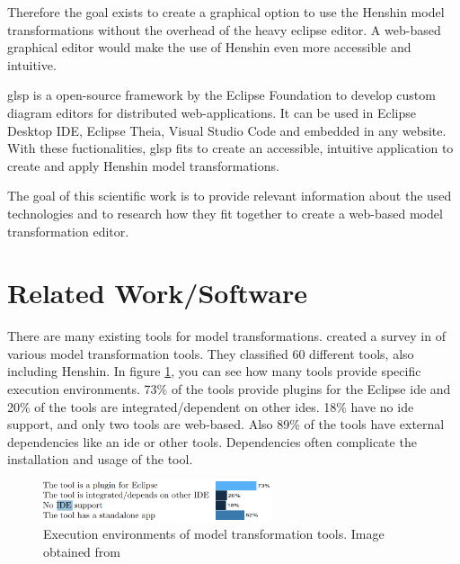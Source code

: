 \documentclass[conference,onecolumn]{IEEEtran}
\begin{document}
  Therefore the goal exists to create a graphical option to use the Henshin model transformations without the overhead of the heavy eclipse editor. A web-based graphical editor would make the use of Henshin even more accessible and intuitive.

  \ac{glsp} is a open-source framework by the Eclipse Foundation to develop custom diagram editors for distributed web-applications. \cite{glsp-repo} It can be used in Eclipse Desktop IDE, Eclipse Theia, Visual Studio Code and embedded in any website. With these fuctionalities, \ac{glsp} fits to create an accessible, intuitive application to create and apply Henshin model transformations.

  The goal of this scientific work is to provide relevant information about the used technologies and to research how they fit together to create a web-based model transformation editor.

  

  \section{Related Work/Software}
  \label{sec:related-work}

  There are many existing tools for model transformations. \citeauthor{kahani2019survey} created a survey in \citeyear{kahani2019survey} of various model transformation tools. They classified 60 different tools, also including Henshin. In figure \ref{fig:tools-environments}, you can see how many tools provide specific execution environments. 73\% of the tools provide plugins for the Eclipse \ac{ide} and 20\% of the tools are integrated/dependent on other \acp{ide}. 18\% have no \ac{ide} support, and only two tools are web-based. Also 89\% of the tools have external dependencies like an \ac{ide} or other tools. Dependencies often complicate the installation and usage of the tool. \cite{kahani2019survey}

  \begin{figure}[H]
    \centering
    \includegraphics[width=0.6\textwidth]{model-tools.png}
    \caption{Execution environments of model transformation tools. Image obtained from \cite{kahani2019survey}}
    \label{fig:tools-environments}
  \end{figure}
\end{document}

